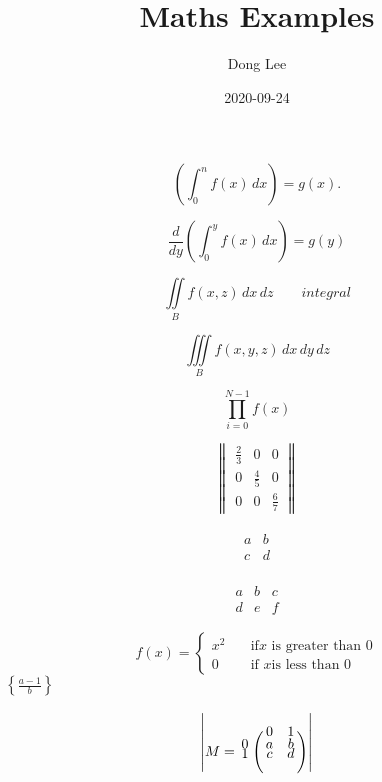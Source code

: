 \documentclass[a4paper,12pt]{article}
\begin{document}
\color{blue}
\title{Maths Examples}
\author{Dong Lee}
\date{2020-09-24}

\maketitle

\begin{center}

\color{green}
\[
\left(\int_{0}^{n}f(x)\,dx\right)=g(x).   %
\]

\color{red}
\[
\frac{d}{dy}\left(\int_{0}^{y} f(x)\,dx\right)=g(y)  %
\]


\color{blue}
\[
  \iint\limits_B f(x,z)\,dx\,dz\qquad integral  %
\]

\color{pink}
\[
 \iiint\limits_B f(x,y,z)\,dx\,dy\,dz  
\]

\color{yellow}
\[
  \prod_{i=0}^{N-1} f(x)
\]

\color{brown}

\[
   \begin{Vmatrix}
   \frac{2}{3} &  0 & 0 \\
   0 & \frac{4}{5} &  0 \\
   0 & 0 & \frac{6}{7}
   \end{Vmatrix}
\]

\color{purple}
\[
	\begin{matrix}
	\begin{array}{c|c}
 	a & b \\
 	\hline
 	c & d
	\end{array}
	\end{matrix}
\]

\color{green}
\[
	\begin{matrix}
	\begin{array}{|l|c|r|}
	a & b & c\\
	\hline
	d & e & f
	\end{array}
	\end{matrix}
\]
\color{gray}

\[ f(x)=
	\begin{cases}
		x^2 & \quad \text{if} x \text{ is greater than 0} \\ %
		0 & \quad \text{if }x \text{is less than 0} %
	\end{cases}
\]
\begin{math}
  \left\{\frac{a-1}{b}\right\}
\end{math}

\color{orange}
\[
	\begin{vmatrix}
	M=\bordermatrix{~ & 0 & 1 \cr
	0 & a & b \cr
	1 & c & d \cr}
	\end{vmatrix}
\]
\end{center}
\end{document}
